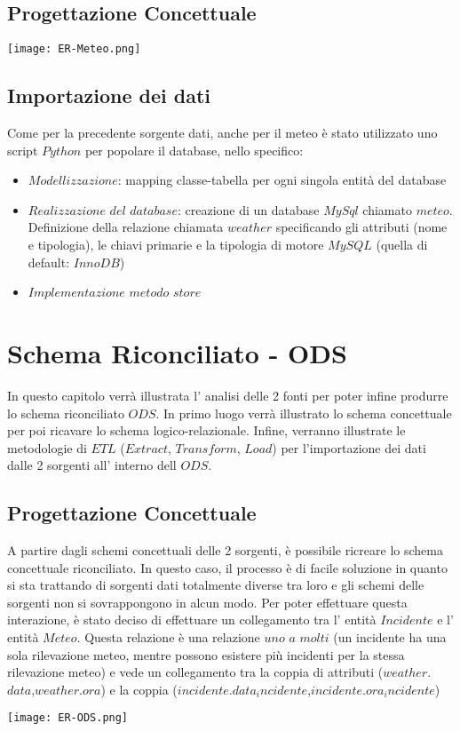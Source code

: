 \documentclass[12pt, a4paper]{scrartcl}
\begin{document}
\subsection*{Progettazione Concettuale}
\begin{center}

\texttt{[image: ER-Meteo.png]}
\end{center}
\subsection*{Importazione dei dati}
Come per la precedente sorgente dati, anche per il meteo è stato utilizzato uno script $Python$ per popolare il database, nello specifico:
\begin{itemize}
\item $Modellizzazione$: mapping classe-tabella per ogni singola entità del database 
\item $Realizzazione$ $del$ $database$: creazione di un database $MySql$ chiamato $meteo$.
Definizione della relazione chiamata $weather$ specificando gli attributi (nome e tipologia), le chiavi
primarie e la tipologia di motore $MySQL$ (quella di default: $InnoDB$)
\item $Implementazione$ $metodo$ $store$
\end{itemize}
\newpage
\section*{Schema Riconciliato - ODS}
In questo capitolo verrà illustrata l' analisi delle 2 fonti per poter infine produrre lo schema riconciliato $ODS$.
In primo luogo verrà illustrato lo schema concettuale per poi ricavare lo schema logico-relazionale. Infine, verranno illustrate le metodologie di $ETL$ ($Extract$, $Transform$, $Load$) per l'importazione dei dati dalle 2 sorgenti all' interno dell $ODS$.
\subsection*{Progettazione Concettuale}
A partire dagli schemi concettuali delle 2 sorgenti, è possibile ricreare lo schema concettuale riconciliato.
In questo caso, il processo è di facile soluzione in quanto si sta trattando di sorgenti dati totalmente diverse tra loro e gli schemi delle sorgenti non si sovrappongono in alcun modo.
Per poter effettuare questa interazione, è stato deciso di effettuare un collegamento tra l' entità $Incidente$ e l' entità $Meteo$. Questa relazione è una relazione $uno$ $a$ $molti$ (un incidente ha una sola rilevazione meteo, mentre possono esistere più incidenti per la stessa rilevazione meteo) e vede un collegamento tra la coppia di attributi ($weather$.$data$,$weather$.$ora$) e la coppia ($incidente$.$data_incidente$,$incidente$.$ora_incidente$)
\begin{center}
\texttt{[image: ER-ODS.png]}
\end{center}
\end{document}
